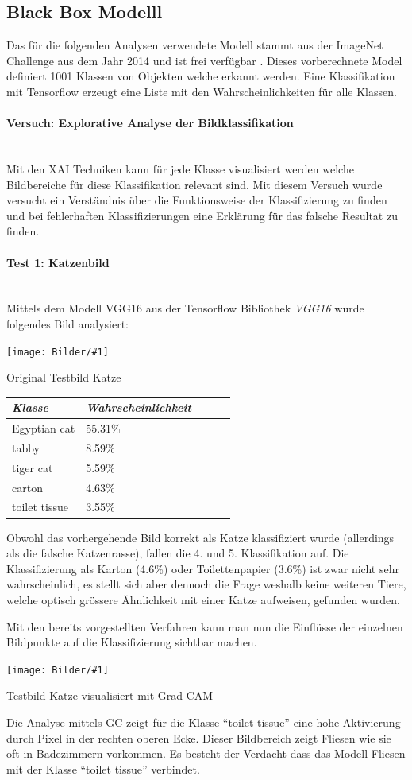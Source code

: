 \documentclass[
  12pt, %
  a4paper, %
  oneside, %
  openany, 
  numbers=noenddot, %
  BCOR=5mm, %
  parskip=half*, %
  thesis, %
]{bfhbook}
\newcommand{\parag}[1]{\paragraph*{#1}\mbox{}\\}
\newcommand{\imgText}[3]{
\begin{center}
    \begin{minipage}[t]{0.6\textwidth}
    		\vspace{0pt}
		\texttt{[image: Bilder/\#1]}
		\caption{#2}
	\end{minipage}\hfill
    \begin{minipage}[t]{0.4\textwidth}
    		\vspace{5pt}
  		#3
    \end{minipage}
\end{center}
}
\begin{document}
\subsection{Black Box Modelll}

Das für die folgenden Analysen verwendete Modell stammt aus der ImageNet Challenge \parencite{imageNet} aus dem Jahr 2014 und ist frei verfügbar \parencite{Simonyan2014}. Dieses vorberechnete Model definiert 1001 Klassen von Objekten welche erkannt werden. Eine Klassifikation mit Tensorflow \cite{TensorFlow} erzeugt eine Liste mit den Wahrscheinlichkeiten für alle Klassen. 

\parag{Versuch: Explorative Analyse der Bildklassifikation}
Mit den \gls{XAI} Techniken kann für jede Klasse visualisiert werden welche Bildbereiche für diese Klassifikation relevant sind. Mit diesem Versuch wurde versucht ein Verständnis über die Funktionsweise der Klassifizierung zu finden und bei fehlerhaften Klassifizierungen eine Erklärung für das falsche Resultat zu finden.

\parag{Test 1: Katzenbild}
Mittels dem Modell VGG16 aus der Tensorflow Bibliothek \textit{VGG16} \cite{vgg16} wurde folgendes Bild analysiert:
\imgText{Mira.jpg}{Original Testbild Katze}{
		
		\begin{tabular}{@{} *5l @{}}    \toprule
		\emph{Klasse} & \emph{Wahrscheinlichkeit} &&&  \\\midrule
		Egyptian cat & 55.31\% \\ 
		 tabby & 8.59\% \\ 
		 tiger cat & 5.59\% \\ 
		 carton & 4.63\% \\
		 toilet tissue & 3.55\% \\ \bottomrule
		 \hline
		\end{tabular}
}

Obwohl das vorhergehende Bild korrekt als Katze klassifiziert wurde (allerdings als die falsche Katzenrasse), fallen die 4. und 5. Klassifikation auf. Die Klassifizierung als Karton (4.6\%) oder Toilettenpapier (3.6\%) ist zwar nicht sehr wahrscheinlich, es stellt sich aber dennoch die Frage weshalb keine weiteren Tiere, welche optisch grössere Ähnlichkeit mit einer Katze aufweisen, gefunden wurden.

 Mit den bereits vorgestellten Verfahren kann man nun die Einflüsse der einzelnen Bildpunkte auf die Klassifizierung sichtbar machen.

\imgText{Grad-Cam-Classes.png}{Testbild Katze visualisiert mit Grad CAM}{
Die Analyse mittels \Gls{GC} zeigt für die Klasse ``toilet tissue'' eine hohe Aktivierung durch Pixel in der rechten oberen Ecke. Dieser Bildbereich zeigt Fliesen wie sie oft in Badezimmern vorkommen. Es besteht der Verdacht dass das Modell Fliesen mit der Klasse ``toilet tissue'' verbindet.
}
\end{document}
